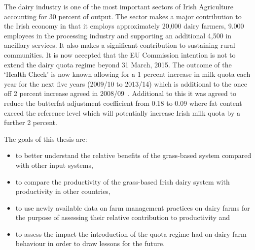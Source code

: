 \documentclass{report}
\begin{document}


The dairy industry is one of the most important sectors of Irish Agriculture accounting for 30 percent of output. The sector makes a major contribution to the Irish economy in that it employs approximately 20,000 dairy farmers, 9.000 employees in the processing industry and supporting an additional 4,500 in ancillary services. It also makes a significant contribution to sustaining rural communities. %
It is now accepted that the EU Commission intention is not to extend the dairy quota regime beyond 31 March, 2015. The outcome of the ‘Health Check’ is now known allowing for a 1 percent increase in milk quota each year for the next five years (2009/10 to 2013/14) which is additional to the once off 2 percent increase agreed in 2008/09~\citep{eucom09}. Additional to this it was agreed to reduce the butterfat adjustment coefficient from 0.18 to 0.09 where fat content exceed the reference level which will potentially increase Irish milk quota by a further 2 percent. 

The goals of this thesis are:
\begin{itemize}
\item  to better understand the relative benefits of the grass-based system compared with other input systems,
\item  to compare the productivity of the grass-based Irish dairy system with productivity in other countries,
\item  to use newly available data on farm management practices on dairy farms for the purpose of assessing their relative contribution to productivity and
\item  to assess the impact the introduction of the quota regime had on dairy farm behaviour in order to draw lessons for the future. 
\end{itemize}
\end{document}
